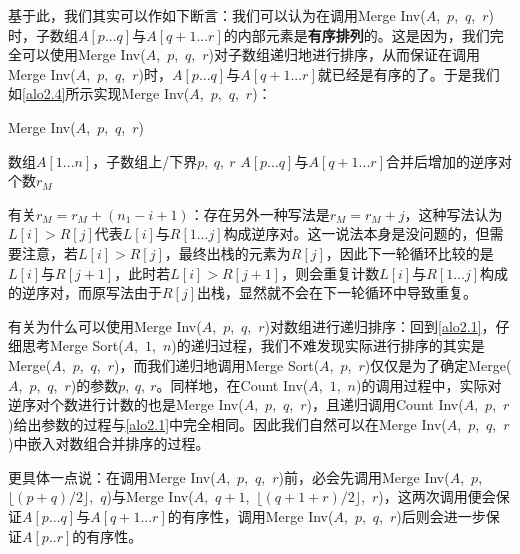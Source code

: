 \documentclass[12pt,a4paper,violet,oneside]{bbe}
\begin{document}
基于此，我们其实可以作如下断言：我们可以认为在调用Merge Inv($A$,~$p$,~$q$,~$r$)时，子数组$A[p...q]$与$A[q+1...r]$的内部元素是\textbf{有序排列}的。这是因为，我们完全可以使用Merge Inv($A$,~$p$,~$q$,~$r$)对子数组递归地进行排序，从而保证在调用Merge Inv($A$,~$p$,~$q$,~$r$)时，$A[p...q]$与$A[q+1...r]$就已经是有序的了。于是我们如\cref{alo2.4}所示实现Merge Inv($A$,~$p$,~$q$,~$r$)：
\\
\begin{algorithm}[H]
	\caption{Merge Inv($A$,~$p$,~$q$,~$r$)}
	\label{alo2.4}
	\begin{algorithmic}[1] 
		\Require 数组$A[1...n]$，子数组上/下界$p,~q,~r$
		\Ensure $A[p...q]$与$A[q+1...r]$合并后增加的逆序对个数$r_M$ 
		\textcolor{blue}{}
		\textcolor{blue}{}
		\EndIf
		\EndFor
	\end{algorithmic} 
\end{algorithm}
\begin{remark}
	有关$r_M=r_M+(n_1-i+1)$：存在另外一种写法是$r_M=r_M+j$，这种写法认为$L[i]>R[j]$代表$L[i]$与$R[1...j]$构成逆序对。这一说法本身是没问题的，但需要注意，若$L[i]>R[j]$，最终出栈的元素为$R[j]$，因此下一轮循环比较的是$L[i]$与$R[j+1]$，此时若$L[i]>R[j+1]$，则会重复计数$L[i]$与$R[1...j]$构成的逆序对，而原写法由于$R[j]$出栈，显然就不会在下一轮循环中导致重复。
\end{remark}
\begin{remark}
	有关为什么可以使用Merge Inv($A$,~$p$,~$q$,~$r$)对数组进行递归排序：回到\cref{alo2.1}，仔细思考Merge Sort($A$,~$1$,~$n$)的递归过程，我们不难发现实际进行排序的其实是Merge($A$,~$p$,~$q$,~$r$)，而我们递归地调用Merge Sort($A$,~$p$,~$r$)仅仅是为了确定Merge($A$,~$p$,~$q$,~$r$)的参数$p,~q,~r$。同样地，在Count Inv($A$,~$1$,~$n$)的调用过程中，实际对逆序对个数进行计数的也是Merge Inv($A$,~$p$,~$q$,~$r$)，且递归调用Count Inv($A$,~$p$,~$r$)给出参数的过程与\cref{alo2.1}中完全相同。因此我们自然可以在Merge Inv($A$,~$p$,~$q$,~$r$)中嵌入对数组合并排序的过程。
	
	更具体一点说：在调用Merge Inv($A$,~$p$,~$q$,~$r$)前，必会先调用Merge Inv($A$,~$p$,~$\lfloor(p+q)/2\rfloor$,~$q$)与Merge Inv($A$,~$q+1$,~$\lfloor(q+1+r)/2\rfloor$,~$r$)，这两次调用便会保证$A[p...q]$与$A[q+1...r]$的有序性，调用Merge Inv($A$,~$p$,~$q$,~$r$)后则会进一步保证$A[p..r]$的有序性。
\end{remark}
\end{document}
